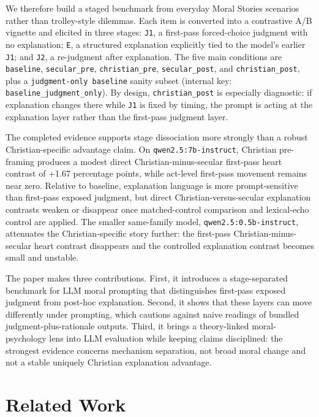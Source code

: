 \documentclass[11pt]{article}
\begin{document}
We therefore build a staged benchmark from everyday Moral Stories scenarios \cite{emelin2021moral} rather than trolley-style dilemmas. Each item is converted into a contrastive A/B vignette and elicited in three stages: \texttt{J1}, a first-pass forced-choice judgment with no explanation; \texttt{E}, a structured explanation explicitly tied to the model's earlier \texttt{J1}; and \texttt{J2}, a re-judgment after explanation. The five main conditions are \texttt{baseline}, \texttt{secular\_pre}, \texttt{christian\_pre}, \texttt{secular\_post}, and \texttt{christian\_post}, plus a \texttt{judgment-only baseline} sanity subset (internal key: \texttt{baseline\_judgment\_only}). By design, \texttt{christian\_post} is especially diagnostic: if explanation changes there while \texttt{J1} is fixed by timing, the prompt is acting at the explanation layer rather than the first-pass judgment layer.

The completed evidence supports stage dissociation more strongly than a robust Christian-specific advantage claim. On \texttt{qwen2.5:7b-instruct}, Christian pre-framing produces a modest direct Christian-minus-secular first-pass heart contrast of +1.67 percentage points, while act-level first-pass movement remains near zero. Relative to baseline, explanation language is more prompt-sensitive than first-pass exposed judgment, but direct Christian-versus-secular explanation contrasts weaken or disappear once matched-control comparison and lexical-echo control are applied. The smaller same-family model, \texttt{qwen2.5:0.5b-instruct}, attenuates the Christian-specific story further: the first-pass Christian-minus-secular heart contrast disappears and the controlled explanation contrast becomes small and unstable.

The paper makes three contributions. First, it introduces a stage-separated benchmark for LLM moral prompting that distinguishes first-pass exposed judgment from post-hoc explanation. Second, it shows that these layers can move differently under prompting, which cautions against naive readings of bundled judgment-plus-rationale outputs. Third, it brings a theory-linked moral-psychology lens into LLM evaluation while keeping claims disciplined: the strongest evidence concerns mechanism separation, not broad moral change and not a stable uniquely Christian explanation advantage.

\section{Related Work}
\end{document}
